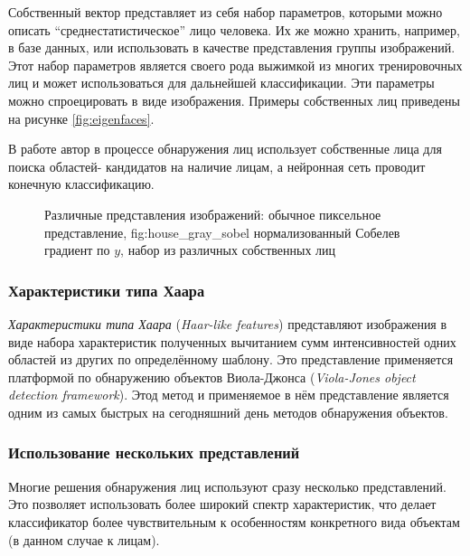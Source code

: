\documentclass[12pt]{report}
\begin{document}
Собственный вектор представляет из себя набор параметров, которыми можно описать ``среднестатистическое'' лицо 
человека. Их же можно хранить, например, в базе данных, или использовать в качестве представления группы 
изображений. Этот набор параметров является своего рода выжимкой из многих тренировочных лиц и может использоваться 
для дальнейшей классификации. Эти параметры можно спроецировать в виде изображения. Примеры собственных лиц 
приведены на рисунке \ref{fig:eigenfaces}.

В работе \citep{tsai2006face} автор в процессе обнаружения лиц использует собственные лица для поиска областей-
кандидатов на наличие лицам, а нейронная сеть проводит конечную классификацию.

\begin{figure}[h]
	\centering
	\caption{Различные представления изображений:  обычное пиксельное представление, \subref
{fig:house_gray_sobel} нормализованный Собелев градиент по $y$,  набор из различных 
собственных лиц}
	\label{fig:representations}
\end{figure}

\subsubsection{Характеристики типа Хаара}
\emph{Характеристики типа Хаара} (\textit{Haar-like features}) представляют изображения в виде набора характеристик 
полученных вычитанием сумм интенсивностей одних областей из других по определённому шаблону. Это представление 
применяется платформой по обнаружению объектов Виола-Джонса (\textit{Viola-Jones object detection 
framework}). \citep{viola2001rapid} Этод метод и применяемое в нём представление является одним из самых быстрых на 
сегодняшний день методов обнаружения объектов.

\subsubsection{Использование нескольких представлений}
Многие решения обнаружения лиц используют сразу несколько представлений. Это позволяет использовать более широкий 
спектр характеристик, что делает классификатор более чувствительным к особенностям конкретного вида объектам (в 
данном случае к лицам).
\end{document}
